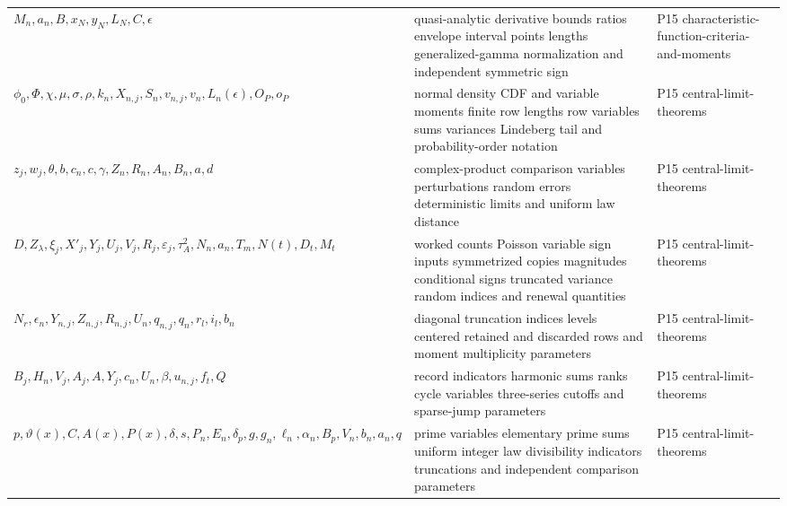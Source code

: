 \begin{longtable}{@{}p{}p{}p{}@{}}
\(M_n,\allowbreak a_n,\allowbreak B,\allowbreak x_N,\allowbreak y_N,\allowbreak L_N,\allowbreak C,\allowbreak \epsilon\) & quasi-analytic derivative bounds ratios envelope interval points lengths generalized-gamma normalization and independent symmetric sign & P15 characteristic-\allowbreak{}function-\allowbreak{}criteria-\allowbreak{}and-\allowbreak{}moments \\
\(\phi_0,\allowbreak \Phi,\allowbreak \chi,\allowbreak \mu,\allowbreak \sigma,\allowbreak \rho,\allowbreak k_n,\allowbreak X_{n,j},\allowbreak S_n,\allowbreak v_{n,j},\allowbreak v_n,\allowbreak L_n(\epsilon),\allowbreak O_P,\allowbreak o_P\) & normal density CDF and variable moments finite row lengths row variables sums variances Lindeberg tail and probability-order notation & P15 central-\allowbreak{}limit-\allowbreak{}theorems \\
\(z_j,\allowbreak w_j,\allowbreak \theta,\allowbreak b,\allowbreak c_n,\allowbreak c,\allowbreak \gamma,\allowbreak Z_n,\allowbreak R_n,\allowbreak A_n,\allowbreak B_n,\allowbreak a,\allowbreak d\) & complex-product comparison variables perturbations random errors deterministic limits and uniform law distance & P15 central-\allowbreak{}limit-\allowbreak{}theorems \\
\(D,\allowbreak Z_\lambda,\allowbreak \xi_j,\allowbreak X'_j,\allowbreak Y_j,\allowbreak U_j,\allowbreak V_j,\allowbreak R_j,\allowbreak \varepsilon_j,\allowbreak \tau_A^2,\allowbreak N_n,\allowbreak a_n,\allowbreak T_m,\allowbreak N(t),\allowbreak D_t,\allowbreak M_t\) & worked counts Poisson variable sign inputs symmetrized copies magnitudes conditional signs truncated variance random indices and renewal quantities & P15 central-\allowbreak{}limit-\allowbreak{}theorems \\
\(N_r,\allowbreak \epsilon_n,\allowbreak Y_{n,j},\allowbreak Z_{n,j},\allowbreak R_{n,j},\allowbreak U_n,\allowbreak q_{n,j},\allowbreak q_n,\allowbreak r_l,\allowbreak i_l,\allowbreak b_n\) & diagonal truncation indices levels centered retained and discarded rows and moment multiplicity parameters & P15 central-\allowbreak{}limit-\allowbreak{}theorems \\
\(B_j,\allowbreak H_n,\allowbreak V_j,\allowbreak A_j,\allowbreak A,\allowbreak Y_j,\allowbreak c_n,\allowbreak U_n,\allowbreak \beta,\allowbreak u_{n,j},\allowbreak f_t,\allowbreak Q\) & record indicators harmonic sums ranks cycle variables three-series cutoffs and sparse-jump parameters & P15 central-\allowbreak{}limit-\allowbreak{}theorems \\
\(p,\allowbreak \vartheta(x),\allowbreak C,\allowbreak A(x),\allowbreak P(x),\allowbreak \delta,\allowbreak s,\allowbreak P_n,\allowbreak E_n,\allowbreak \delta_p,\allowbreak g,\allowbreak g_n,\allowbreak \ell_n,\allowbreak \alpha_n,\allowbreak B_p,\allowbreak V_n,\allowbreak b_n,\allowbreak a_n,\allowbreak q\) & prime variables elementary prime sums uniform integer law divisibility indicators truncations and independent comparison parameters & P15 central-\allowbreak{}limit-\allowbreak{}theorems \\

\end{longtable}
